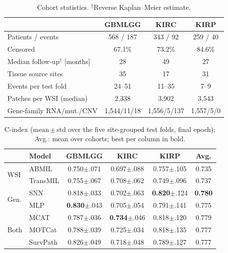 \documentclass[10pt,twocolumn,letterpaper]{article}
\newcommand{\pmstd}[1]{{\scriptsize$\pm$#1}}
\begin{document}
\begin{table}[t]
  \centering
  \footnotesize
  \setlength{\tabcolsep}{3.2pt}
  \begin{tabular}{@{}lccc@{}}
    \toprule
                                       & GBMLGG & KIRC & KIRP\\
    \midrule
    Patients / events                  & 568 / 187 & 343 / 92 & 259 / 40\\
    Censored                           & 67.1\% & 73.2\% & 84.6\%\\
    Median follow-up$^\dagger$ [months]& 28 & 49 & 27\\
    Tissue source sites                & 35 & 17 & 31\\
    Events per test fold               & 24--51 & 11--35 & 7--9\\
    Patches per WSI (median)           & 2,338 & 3,902 & 3,543\\
    Gene-family RNA/mut./CNV           & 1,544/11/18 & 1,556/5/137 & 1,557/5/0\\
    \bottomrule
  \end{tabular}
  \caption{Cohort statistics. $^\dagger$Reverse Kaplan--Meier estimate.}
  \label{tab:cohorts}
\end{table}

\begin{table}[t]
  \centering
  \footnotesize
  \setlength{\tabcolsep}{2.4pt}
  \begin{tabular}{@{}llcccc@{}}
    \toprule
    & Model & GBMLGG & KIRC & KIRP & Avg.\\
    \midrule
    \multirow{2}{*}{WSI}   & ABMIL             & 0.750\pmstd{.071} & 0.697\pmstd{.088} & 0.757\pmstd{.105} & 0.735\\
                           & TransMIL          & 0.755\pmstd{.067} & 0.708\pmstd{.062} & 0.749\pmstd{.096} & 0.737\\
    \midrule
    \multirow{2}{*}{Gen.}  & SNN               & 0.818\pmstd{.033} & 0.702\pmstd{.063} & \textbf{0.820}\pmstd{.124} & \textbf{0.780}\\
                           & MLP               & \textbf{0.830}\pmstd{.043} & 0.705\pmstd{.054} & 0.791\pmstd{.141} & 0.775\\
    \midrule
    \multirow{3}{*}{Both}  & MCAT              & 0.787\pmstd{.036} & \textbf{0.734}\pmstd{.046} & 0.818\pmstd{.120} & 0.779\\
                           & MOTCat            & 0.788\pmstd{.039} & 0.725\pmstd{.034} & 0.818\pmstd{.135} & 0.777\\
                           & SurvPath          & 0.826\pmstd{.049} & 0.718\pmstd{.048} & 0.789\pmstd{.127} & 0.777\\
    \bottomrule
  \end{tabular}
  \caption{C-index (mean\,$\pm$\,std over the five site-grouped test folds, final epoch); Avg.: mean over cohorts; best per column in bold.}
  \label{tab:results}
\end{table}
\end{document}
